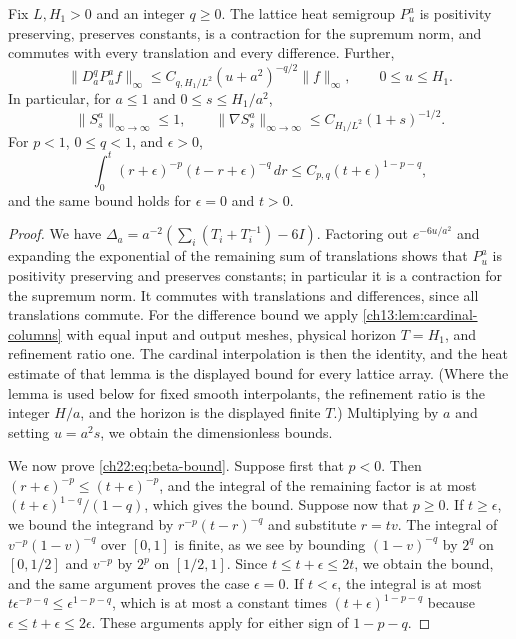 \begin{lemma}\label{ch22:lem:heat-calculus}
Fix $L,H_1>0$ and an integer $q\ge0$. The lattice heat semigroup $P_u^a$ is positivity preserving, preserves constants, is a contraction for the supremum norm, and commutes with every translation and every difference. Further,
\[
 \|D_a^qP_u^af\|_\infty\le C_{q,H_1/L^2}(u+a^2)^{-q/2}\|f\|_\infty,\qquad 0\le u\le H_1 .
\]
In particular, for $a\le1$ and $0\le s\le H_1/a^2$,
\[
 \|S_s^a\|_{\infty\to\infty}\le1,\qquad
 \|\nabla S_s^a\|_{\infty\to\infty}\le C_{H_1/L^2}(1+s)^{-1/2}.
\]
For $p<1$, $0\le q<1$, and $\epsilon>0$,
\begin{equation}\label{ch22:eq:beta-bound}
 \int_0^t(r+\epsilon)^{-p}(t-r+\epsilon)^{-q}\,dr\le C_{p,q}(t+\epsilon)^{1-p-q},
\end{equation}
and the same bound holds for $\epsilon=0$ and $t>0$.
\end{lemma}

\begin{proof}
We have $\Delta_a=a^{-2}(\sum_i(T_i+T_i^{-1})-6I)$. Factoring out $e^{-6u/a^2}$ and expanding the exponential of the remaining sum of translations shows that $P_u^a$ is positivity preserving and preserves constants; in particular it is a contraction for the supremum norm. It commutes with translations and differences, since all translations commute. For the difference bound we apply \cref{ch13:lem:cardinal-columns} with equal input and output meshes, physical horizon $T=H_1$, and refinement ratio one. The cardinal interpolation is then the identity, and the heat estimate of that lemma is the displayed bound for every lattice array. (Where the lemma is used below for fixed smooth interpolants, the refinement ratio is the integer $H/a$, and the horizon is the displayed finite $T$.) Multiplying by $a$ and setting $u=a^2s$, we obtain the dimensionless bounds.

We now prove \eqref{ch22:eq:beta-bound}. Suppose first that $p<0$. Then $(r+\epsilon)^{-p}\le(t+\epsilon)^{-p}$, and the integral of the remaining factor is at most $(t+\epsilon)^{1-q}/(1-q)$, which gives the bound. Suppose now that $p\ge0$. If $t\ge\epsilon$, we bound the integrand by $r^{-p}(t-r)^{-q}$ and substitute $r=tv$. The integral of $v^{-p}(1-v)^{-q}$ over $[0,1]$ is finite, as we see by bounding $(1-v)^{-q}$ by $2^{q}$ on $[0,1/2]$ and $v^{-p}$ by $2^p$ on $[1/2,1]$. Since $t\le t+\epsilon\le2t$, we obtain the bound, and the same argument proves the case $\epsilon=0$. If $t<\epsilon$, the integral is at most $t\epsilon^{-p-q}\le\epsilon^{1-p-q}$, which is at most a constant times $(t+\epsilon)^{1-p-q}$ because $\epsilon\le t+\epsilon\le2\epsilon$. These arguments apply for either sign of $1-p-q$.
\end{proof}


